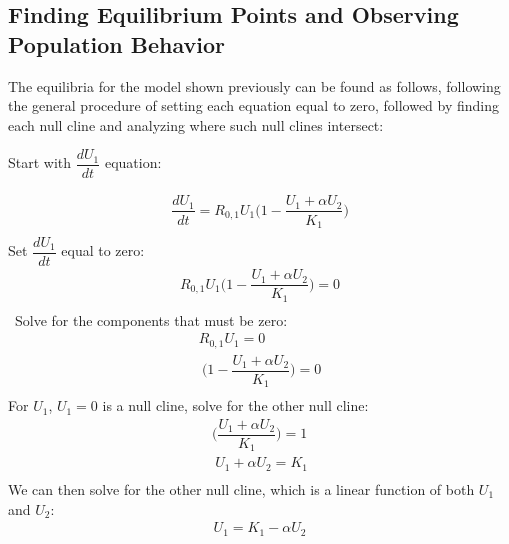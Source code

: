 \documentclass[12pt]{article}
\begin{document}
\subsection*{Finding Equilibrium Points and Observing Population Behavior }

The equilibria for the model shown previously can be found as follows, following the general procedure of setting each equation equal to zero, followed by finding each null cline and analyzing where such null clines intersect:
\begin{flushleft}
Start with $\dfrac{dU_1}{dt}$ equation:
\end{flushleft}
\begin{gather*}
\dfrac{dU_1}{dt} = R_{0,1}U_1\Big(1 - \dfrac{U_1+{\alpha}U_2}{K_1}\Big) \\
\end{gather*}
Set $\dfrac{dU_1}{dt}$ equal to zero:
\begin{gather*}
R_{0,1}U_1\Big(1 - \dfrac{U_1+{\alpha}U_2}{K_1}\Big) = 0 \\
\end{gather*}\
Solve for the components that must be zero:	
\begin{gather*}
 R_{0,1}U_1 = 0\\\
 \Big(1 - \dfrac{U_1+{\alpha}U_2}{K_1}\Big) = 0\\
\end{gather*}
For $U_1$, $U_1 = 0$ is a null cline, solve for the other null cline:
\begin{gather*}
\Big(\dfrac{U_1+{\alpha}U_2}{K_1}\Big) = 1 \\\
U_1+{\alpha}U_2 = K_1 \\\
\end{gather*}
We can then solve for the other null cline, which is a linear function of both $U_1$ and $U_2$:
\begin{gather*}
U_1 = K_1 - {\alpha}U_2 \\\
\end{gather*}

\end{document}
